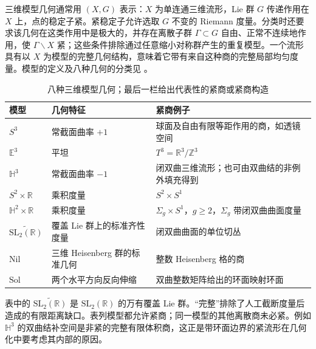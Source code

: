 \ProseParagraphBreak

三维模型几何通常用 \((X,G)\) 表示：\(X\) 为单连通三维流形，Lie 群 \(G\) 传递作用在 \(X\) 上，点的稳定子紧。紧稳定子允许选取 \(G\) 不变的 Riemann 度量。分类时还要求该几何在这类作用中是极大的，并存在离散子群 \(\Gamma\subset G\) 自由、正常不连续地作用，使 \(\Gamma\backslash X\) 紧；这些条件排除通过任意缩小对称群产生的重复模型。一个流形具有以 \(X\) 为模型的完整几何结构，意味着它带有来自这种商的完整局部均匀度量。模型的定义及八种几何的分类见 \cite[第4—5节]{Scott1983}。

\begin{table}[htbp]
	\centering
	\small
	\caption{八种三维模型几何；最后一栏给出代表性的紧商或紧商构造}
	\label{g2:tab:eight-three-geometries}
	\begin{tabularx}{\textwidth}{@{}l l X@{}}
		\toprule
		模型 & 几何特征 & 紧商例子 \\
		\midrule
		\(S^3\) & 常截面曲率 \(+1\) & 球面及自由有限等距作用的商，如透镜空间 \\
		\(\mathbb E^3\) & 平坦 & \(T^3=\mathbb R^3/\mathbb Z^3\) \\
		\(\mathbb H^3\) & 常截面曲率 \(-1\) & 闭双曲三维流形；也可由双曲结的非例外填充得到 \\
		\(S^2\times\mathbb R\) & 乘积度量 & \(S^2\times S^1\) \\
		\(\mathbb H^2\times\mathbb R\) & 乘积度量 & \(\Sigma_g\times S^1\)，\(g\ge2\)，\(\Sigma_g\) 带闭双曲曲面度量 \\
		\(\widetilde{\mathrm{SL}_2(\mathbb R)}\) & 覆盖 Lie 群上的标准齐性度量 & 闭双曲曲面的单位切丛 \\
		\(\mathrm{Nil}\) & 三维 Heisenberg 群的标准几何 & 整数 Heisenberg 格的商 \\
		\(\mathrm{Sol}\) & 两个水平方向反向伸缩 & 双曲整数矩阵给出的环面映射环面 \\
		\bottomrule
	\end{tabularx}
\end{table}

表中的 \(\widetilde{\mathrm{SL}_2(\mathbb R)}\) 是 \(\mathrm{SL}_2(\mathbb R)\) 的万有覆盖 Lie 群。“完整”排除了人工截断度量后造成的有限距离缺口。表列模型都允许紧商；同一模型的其他离散商未必紧。例如 \(\mathbb H^3\) 的双曲结补空间是非紧的完整有限体积商，这正是带环面边界的紧流形在几何化中要考虑其内部的原因。

\ProseParagraphBreak

